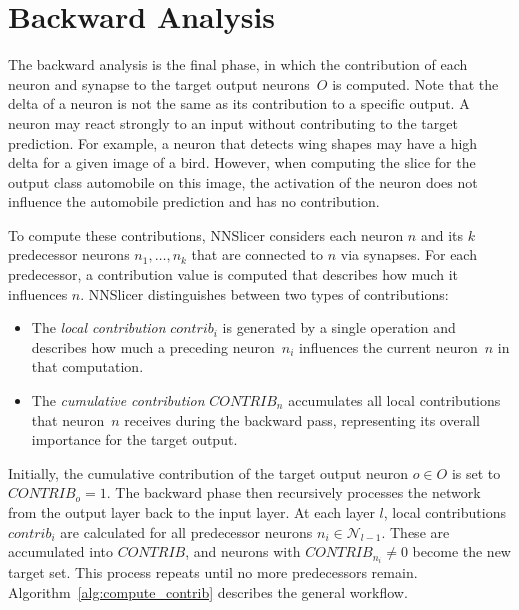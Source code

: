 \documentclass[
12pt,
fancyheadings,
a4paper,
twoside,
BCOR=0.7cm,
nobcorignoretitle,
grayscalebody,
]{stsreprt}
\begin{document}
\section{Backward Analysis}
\label{sec:backward_analysis}

The backward analysis is the final phase, in which the contribution of each neuron and synapse to
the target output neurons~$O$ is computed.
Note that the delta of a neuron is not the same as its contribution to a specific output.
A neuron may react strongly to an input without contributing to the target prediction.
For example, a neuron that detects wing shapes may have a high delta for a given image of a bird.
However, when computing the slice for the output class automobile on this image, the activation of
the neuron does not influence the automobile prediction and has no contribution.

To compute these contributions, NNSlicer considers each neuron $n$ and its $k$ predecessor neurons
$n_1, \dots, n_k$ that are connected to $n$ via synapses.
For each predecessor, a contribution value is computed that describes how much it influences $n$.
NNSlicer distinguishes between two types of contributions:
\begin{itemize}
    \item The \textit{local contribution} $\textit{contrib}_i$ is generated by a single operation and describes how much a preceding neuron~$n_i$ influences the current neuron~$n$ in that computation.
    \item The \textit{cumulative contribution} $\textit{CONTRIB}_n$ accumulates all local contributions that neuron~$n$ receives during the backward pass, representing its overall importance for the target output.
\end{itemize}
Initially, the cumulative contribution of the target output neuron $o \in O$ is set to
$\textit{CONTRIB}_o = 1$.
The backward phase then recursively processes the network from the output layer back to the input
layer.
At each layer $l$, local contributions $\textit{contrib}_i$ are calculated for all predecessor
neurons $n_i \in \mathcal{N}_{l-1}$.
These are accumulated into $\textit{CONTRIB}$, and neurons with $\textit{CONTRIB}_{n_i} \neq 0$
become the new target set.
This process repeats until no more predecessors remain.
Algorithm~\ref{alg:compute_contrib} describes the general workflow.
\end{document}
